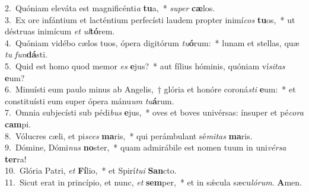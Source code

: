 {2.~}Quóniam eleváta est magnificénti\textit{a} \textbf{tu}a,~* \textit{su}\textit{per} \textbf{cæ}los.\\
{3.~}Ex ore infántium et lacténtium perfecísti laudem propter inimí\textit{cos} \textbf{tu}os,~* ut déstruas inimícum \textit{et} \textit{ul}\textbf{tó}rem.\\
{4.~}Quóniam vidébo cælos tuos, ópera digitórum \textit{tu}\textbf{ó}rum:~* lunam et stellas, quæ \textit{tu} \textit{fun}\textbf{dá}sti.\\
{5.~}Quid est homo quod memor \textit{es} \textbf{e}jus?~* aut fílius hóminis, quóniam ví\textit{si}\textit{tas} \textbf{e}um?\\
{6.~}Minuísti eum paulo minus ab Angelis,~† glória et honóre coroná\textit{sti} \textbf{e}um:~* et constituísti eum super ópera mánu\textit{um} \textit{tu}\textbf{á}rum.\\
{7.~}Omnia subjecísti sub pédi\textit{bus} \textbf{e}jus,~* oves et boves univérsas: ínsuper et pé\textit{co}\textit{ra} \textbf{cam}pi.\\
{8.~}Vólucres cæli, et pi\textit{sces} \textbf{ma}ris,~* qui perámbulant sé\textit{mi}\textit{tas} \textbf{ma}ris.\\
{9.~}Dómine, Dómi\textit{nus} \textbf{no}ster,~* quam admirábile est nomen tuum in uni\textit{vér}\textit{sa} \textbf{ter}ra!\\
{10.~}Glória Patri, \textit{et} \textbf{Fí}lio,~* et Spirí\textit{tu}\textit{i} \textbf{San}cto.\\
{11.~}Sicut erat in princípio, et nunc, \textit{et} \textbf{sem}per,~* et in sǽcula sæcu\textit{ló}\textit{rum}. \textbf{A}men.\\
